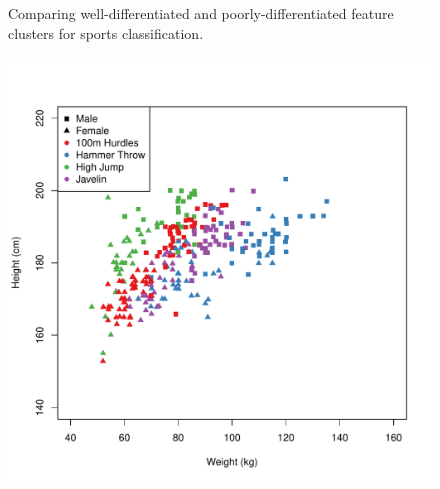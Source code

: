 \begin{center}
\begin{figure}
\begin{minipage}{0.45\textwidth}
\begin{center}
      \end{center}
    \end{minipage}
    \caption{Comparing well-differentiated and poorly-differentiated feature clusters for sports classification.}
    \label{sports-features}
   \end{figure} 
\end{center} 

\begin{center}
  \begin{figure}
    \begin{minipage}{0.45\textwidth}
      \begin{center}
        \includegraphics[scale=0.40]{../graphics/javelin.pdf}
      \end{center}
    \end{minipage}
    \hspace{0.05\textwidth}
    \begin{minipage}{0.45\textwidth}
      \begin{center}

\end{center}
\end{minipage}
\end{figure}
\end{center}

